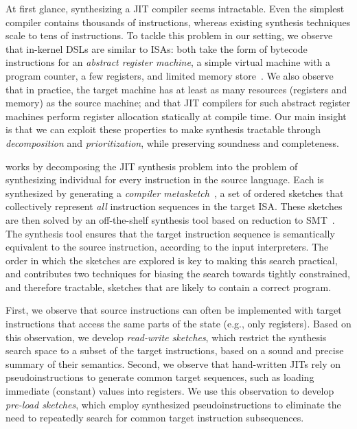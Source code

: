 At first glance, synthesizing a JIT compiler seems intractable. Even the simplest
compiler contains thousands of instructions, whereas existing synthesis
techniques scale to tens of instructions. To tackle this problem in our setting,
we observe that in-kernel DSLs are similar to ISAs: both take the form of
bytecode instructions for an \emph{abstract register machine}, a simple virtual
machine with a program counter, a few registers, and limited memory
store~\cite{wang:jitk}. We also observe that in practice, the target machine has
at least as many resources (registers and memory) as the source machine;
and that JIT compilers for such abstract register machines
perform register allocation statically at compile time.
%
Our main insight is that we can exploit these properties to make synthesis
tractable through \emph{decomposition} and \emph{prioritization}, while
preserving soundness and completeness.\tighten

\jitsynth works by decomposing the JIT synthesis problem into the problem of
synthesizing individual \emph{\minicompilers} for every instruction in the
source language. Each \minicompiler is synthesized by generating a
\emph{compiler metasketch}~\cite{bornholt:synapse}, a set of ordered sketches
that collectively represent \emph{all} instruction sequences in the target
ISA\@. These sketches are then solved by an off-the-shelf synthesis tool based
on reduction to SMT~\cite{torlak:rosette}. The synthesis tool ensures that the
target instruction sequence is semantically equivalent to the source
instruction, according to the input interpreters.  The order in which the
sketches are explored is key to making this search practical, and \jitsynth
contributes two techniques for biasing the search towards tightly constrained,
and therefore tractable, sketches that are likely to contain a correct program. 

First, we observe that source instructions can often be implemented with target
instructions that access the same parts of the state (e.g., only registers).
Based on this observation, we develop \emph{read-write sketches}, which restrict
the synthesis search space to a subset of the target instructions, based on a
sound and precise summary of their semantics. Second, we observe that
hand-written JITs rely on pseudoinstructions to generate common target
sequences, such as loading immediate (constant) values into registers. We use
this observation to develop \emph{pre-load sketches}, which employ synthesized
pseudoinstructions to eliminate the need to repeatedly search for common target
instruction subsequences.   

